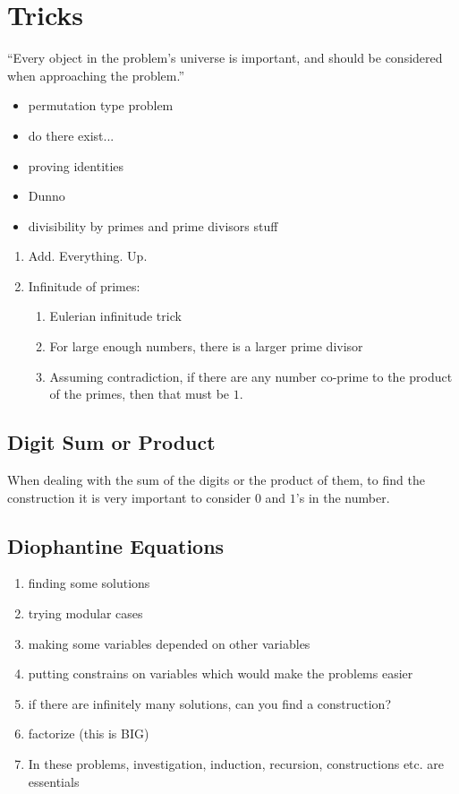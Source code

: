 \section{Tricks}

``Every object in the problem's universe is important, and should be
considered when approaching the problem.''

\begin{itemize}
    \item permutation type problem
    \item do there exist...
    \item proving identities
    \item Dunno
    \item divisibility by primes and prime divisors stuff
\end{itemize}

\begin{enumerate}
    \item Add. Everything. Up.
    \item Infinitude of primes:
        \begin{enumerate}
            \item Eulerian infinitude trick
            \item For large enough numbers, there is a larger prime divisor
            \item Assuming contradiction, if there are any number co-prime to
                the product of the primes, then that must be $ 1 $. 
        \end{enumerate}
\end{enumerate}

\Faka\subsection{Digit Sum or Product}

When dealing with the sum of the digits or the product of them, to find the
construction it is very important to consider $ 0 $ and $ 1 $'s in the number.


\Faka\subsection{Diophantine Equations}

\begin{enumerate}
    \item finding some solutions
    \item trying modular cases
    \item making some variables depended on other variables
    \item putting constrains on variables which would make the problems easier
    \item if there are infinitely many solutions, can you find a construction?
    \item factorize (this is BIG)
    \item In these problems, investigation, induction, recursion,
        constructions etc. are essentials
\end{enumerate}

